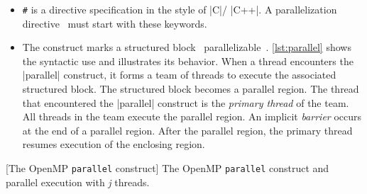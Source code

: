 \begin{itemize}

\item \texttt{\#}
is a directive specification in the style of
\pr|C|/%
\pr|C++|.
A {parallelization directive}~ must start with these keywords.

\item The  construct
marks a {structured block}~ parallelizable~\cite[p. 384--385]{openmp_api}.
\autoref{lst:parallel} shows the syntactic use and illustrates its behavior.
When a thread encounters the \pr|parallel| construct,
it forms a {team of threads} to execute the associated {structured block}.
The structured block becomes a {parallel region}.
The thread that encountered the \pr|parallel| construct is the \emph{primary thread} of the team.
All threads in the team execute the {parallel region}.
An implicit \emph{barrier} occurs at the end of a {parallel region}.
After the parallel region, the {primary thread} resumes execution of the enclosing region.

\end{itemize}

\begin{center}
\begin{minipage}{\textwidth}
\begin{minipage}{.45\textwidth}
\end{minipage}\hfill%
\begin{minipage}{.5\textwidth}
\hfill{}
\end{minipage}
[The OpenMP \texttt{parallel} construct]{
The OpenMP \texttt{parallel} construct and parallel execution with \textit{j} threads.
}\label{lst:parallel}
\end{minipage}
\end{center}

